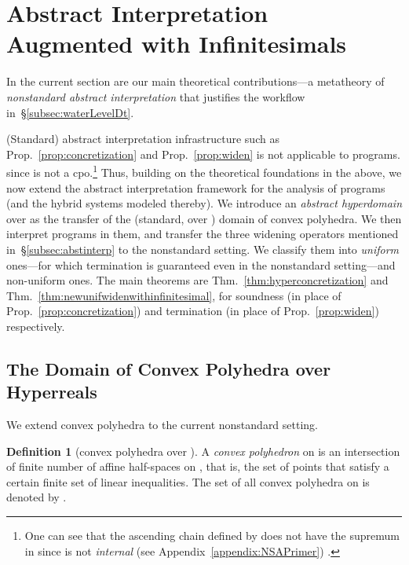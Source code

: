 \documentclass[envcountsect,orivec]{llncs} \pdfoutput=1
\theoremstyle{definition}
\newtheorem{mydef}[mythm]{Definition}
\begin{document}
\section{Abstract Interpretation Augmented with Infinitesimals}
\label{sec:NSAI} 
In the current section are our main theoretical contributions---a
metatheory of \emph{nonstandard abstract interpretation} that justifies 
the workflow in~\S{}\ref{subsec:waterLevelDt}. 

(Standard) abstract interpretation infrastructure such as Prop.~\ref{prop:concretization} and Prop.~\ref{prop:widen} is not applicable to  programs.
since  is not a cpo.\footnote{One can see that the ascending chain defined by  does not have the supremum in  since  is not \emph{internal}  (see Appendix~\ref{appendix:NSAPrimer})
.}
Thus, building on the theoretical foundations in the above, we now extend the abstract interpretation framework for the
analysis of  programs (and the hybrid systems modeled
thereby).  We introduce an \emph{abstract hyperdomain} over   as the transfer of
the 
(standard, over ) domain of convex polyhedra. We then interpret 
programs in them, and transfer the three widening operators mentioned in~\S{}\ref{subsec:abstinterp} to the
nonstandard setting. We classify them into \emph{uniform} ones---for
which termination is guaranteed even in the nonstandard setting---and
non-uniform ones.
The main theorems are Thm.~\ref{thm:hyperconcretization} and Thm.~\ref{thm:newunifwidenwithinfinitesimal}, for soundness (in place of Prop.~\ref{prop:concretization}) and termination (in place of Prop.~\ref{prop:widen}) respectively.





\subsection{The Domain of Convex Polyhedra over Hyperreals}
\label{subsec:abstractDomainOverHyperreals}


We extend   convex polyhedra to the current nonstandard setting.
\begin{mydef}[convex polyhedra over ]\label{def:hyperConvexPoly}
 A \emph{convex polyhedron} on  is an intersection of
 finite number of affine half-spaces  on , that is, the
 set of points  that satisfy a certain
 finite set of linear inequalities.
The set of all convex polyhedra on  is denoted by
 .
 
\end{mydef}
\end{document}

